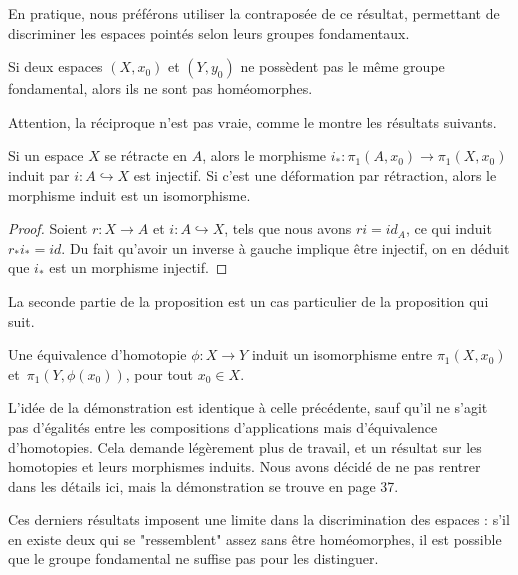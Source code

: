En pratique, nous préférons utiliser la contraposée de ce résultat, permettant de discriminer les espaces pointés selon leurs groupes fondamentaux.

\begin{corollary}
Si deux espaces $(X,x_0)$ et $(Y,y_0)$ ne possèdent pas le même groupe fondamental, alors ils ne sont pas homéomorphes.
\end{corollary}

Attention, la réciproque n'est pas vraie, comme le montre les résultats suivants. 

\begin{proposition}
Si un espace $X$ se rétracte en $A$, alors le morphisme $i_\ast:\pi_1(A,x_0)\to\pi_1(X,x_0)$ induit par $i: A\hookrightarrow X$ est injectif. Si c'est une déformation par rétraction, alors le morphisme induit est un isomorphisme.
\end{proposition}
\begin{proof}
Soient $r:X\to A$ et $i:A\hookrightarrow X$, tels que nous avons $ri=id_A$, ce qui induit~$r_\ast i_\ast=id$. Du fait qu'avoir un inverse à gauche implique être injectif, on en déduit que $i_\ast$ est un morphisme injectif.
\end{proof}

La seconde partie de la proposition est un cas particulier de la proposition qui suit.

\begin{proposition}\label{prop:eq-homo-same-gr-fund}
Une équivalence d'homotopie $\phi:X\to Y$ induit un isomorphisme  entre $\pi_1(X,x_0)$ et~$\pi_1(Y,\phi(x_0))$, pour tout $x_0\in X$.
\end{proposition}

L'idée de la démonstration est identique à celle précédente, sauf qu'il ne s'agit pas d'égalités entre les compositions d'applications mais d'équivalence d'homotopies. Cela demande légèrement plus de travail, et un résultat sur les homotopies et leurs morphismes induits. Nous avons décidé de ne pas rentrer dans les détails ici, mais la démonstration se trouve en \cite{Hatcher} page 37.

\bigskip Ces derniers résultats imposent une limite dans la discrimination des espaces : s'il en existe deux qui se "ressemblent" assez sans être homéomorphes, il est possible que le groupe fondamental ne suffise pas pour les distinguer.